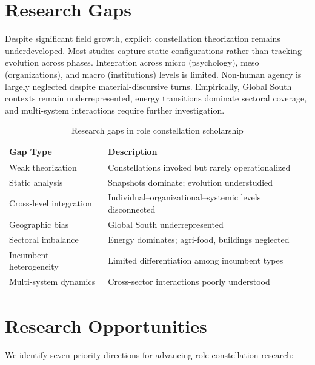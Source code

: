\documentclass[11pt,a4paper]{article}
\begin{document}
\section{Research Gaps}

Despite significant field growth, explicit constellation theorization remains underdeveloped. Most studies capture static configurations rather than tracking evolution across phases. Integration across micro (psychology), meso (organizations), and macro (institutions) levels is limited. Non-human agency is largely neglected despite material-discursive turns. Empirically, Global South contexts remain underrepresented, energy transitions dominate sectoral coverage, and multi-system interactions require further investigation.

\begin{table}[htbp]
\centering
\small
\caption{Research gaps in role constellation scholarship}
\label{tab:gaps}
\begin{tabular}{@{}p{2.8cm}p{9cm}@{}}
\toprule
\textbf{Gap Type} & \textbf{Description} \\
\midrule
Weak theorization & Constellations invoked but rarely operationalized \\
Static analysis & Snapshots dominate; evolution understudied \\
Cross-level integration & Individual--organizational--systemic levels disconnected \\
Geographic bias & Global South underrepresented \\
Sectoral imbalance & Energy dominates; agri-food, buildings neglected \\
Incumbent heterogeneity & Limited differentiation among incumbent types \\
Multi-system dynamics & Cross-sector interactions poorly understood \\
\bottomrule
\end{tabular}
\end{table}

\section{Research Opportunities}

We identify seven priority directions for advancing role constellation research:
\end{document}
